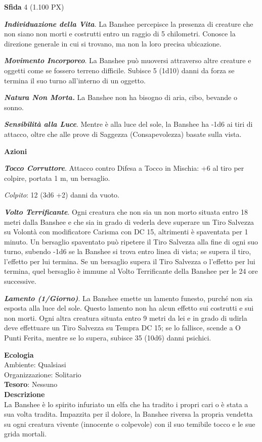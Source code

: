 \begin{multicols}{2}
	\textbf{Sfida} 4 (1.100 PX)

	\textit{\textbf{Individuazione della Vita}}. La Banshee percepisce la presenza di creature che non siano non morti e costrutti entro un raggio di 5 chilometri. Conosce la direzione generale in cui si trovano, ma non la loro precisa ubicazione.

	\textit{\textbf{Movimento Incorporeo}}. La Banshee può muoversi attraverso altre creature e oggetti come se fossero terreno difficile. Subisce 5 (1d10) danni da forza se termina il suo turno all'interno di un oggetto.

	\textit{\textbf{Natura Non Morta.}} La Banshee non ha bisogno di aria, cibo, bevande o sonno.

	\textit{\textbf{Sensibilità alla Luce}}. Mentre è alla luce del sole, la Banshee ha -1d6 ai tiri di attacco, oltre che alle prove di Saggezza (Consapevolezza) basate sulla vista.

	\textbf{Azioni}

	\textit{\textbf{Tocco Corruttore}}. Attacco contro Difesa a Tocco in Mischia: +6 al tiro per colpire, portata 1 m, un bersaglio.

	\textit{Colpito}: 12 (3d6 +2) danni da vuoto.

	\textit{\textbf{Volto Terrificante}}. Ogni creatura che non sia un non morto situata entro 18 metri dalla Banshee e che sia in grado di vederla deve superare un Tiro Salvezza su Volontà con modificatore Carisma con DC 15, altrimenti è spaventata per 1 minuto. Un bersaglio spaventato può ripetere il Tiro Salvezza alla fine di ogni suo turno, subendo -1d6 se la Banshee si trova entro linea di vista; se supera il tiro, l'effetto per lui termina. Se un bersaglio supera il Tiro Salvezza o l'effetto per lui termina, quel bersaglio è immune al Volto Terrificante della Banshee per le 24 ore successive.

	\textit{\textbf{Lamento (1/Giorno)}}. La Banshee emette un lamento funesto, purché non sia esposta alla luce del sole. Questo lamento non ha alcun effetto sui costrutti e sui non morti. Ogni altra creatura situata entro 9 metri da lei e in grado di udirla deve effettuare un Tiro Salvezza su Tempra DC 15; se lo fallisce, scende a O Punti Ferita, mentre se lo supera, subisce 35 (10d6) danni psichici.

	\textbf{Ecologia}\\
	Ambiente: Qualsiasi\\
	Organizzazione: Solitario\\
	\textbf{Tesoro}: Nessuno\\
	\textbf{Descrizione}\\
	La Banshee è lo spirito infuriato un elfa che ha tradito i propri cari o è stata a sua volta tradita. Impazzita per il dolore, la Banshee riversa la propria vendetta su ogni creatura vivente (innocente o colpevole) con il suo temibile tocco e le sue grida mortali.


\end{multicols}
